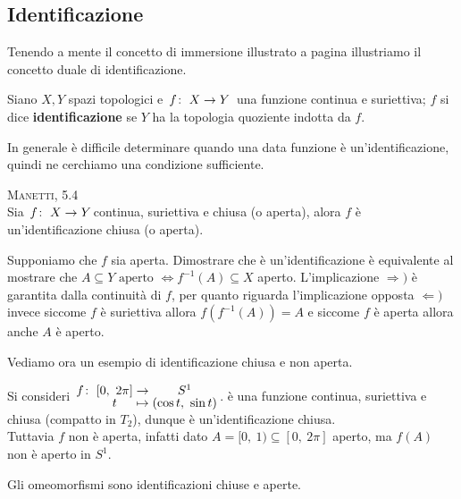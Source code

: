 	\subsection{Identificazione}
Tenendo a mente il concetto di immersione illustrato a pagina \pageref{immersione} illustriamo il concetto duale di identificazione.
\begin{define}
	Siano $X,Y$ spazi topologici e $\funz f X Y$ una funzione continua e suriettiva; $f$ si dice \textbf{identificazione} se $Y$ ha la topologia quoziente indotta da $f$.
\end{define}
In generale è difficile determinare quando una data funzione è un'identificazione, quindi ne cerchiamo una condizione sufficiente. 
\begin{theorema} \textsc{Manetti, 5.4}\\
	Sia $\funz f X Y$continua, suriettiva e chiusa (o aperta), alora $f$ è un'identificazione chiusa (o aperta).
\end{theorema}
\begin{demonstration}
	Supponiamo che $f$ sia aperta. Dimostrare che è un'identificazione è equivalente al mostrare che $\displaystyle A\subseteq Y \text{ aperto } \iff f^{-1}(A)\subseteq X$ aperto. L'implicazione $\Rightarrow)$ è garantita dalla continuità di $f$, per quanto riguarda l'implicazione opposta $\Leftarrow)$ invece siccome $f$ è suriettiva allora $f(f^{-1}(A))=A$ e siccome $f$ è aperta allora anche $A$ è aperto.
\end{demonstration}

Vediamo ora un esempio di identificazione chiusa e non aperta.
\begin{example}
	Si consideri $\displaystyle \funztot f {[0, \ 2\pi]} {S^1} t {(\cos t, \ \sin t)}$. è una funzione continua, suriettiva e chiusa (compatto in $T_2$), dunque è un'identificazione chiusa. \\
	Tuttavia $f$ non è aperta, infatti dato $A=[0, \ 1)\subseteq [0, \ 2\pi]$ aperto, ma $f(A)$ non è aperto in $S^1$.
\end{example}

\begin{observe}
	Gli omeomorfismi sono identificazioni chiuse e aperte.
\end{observe}

